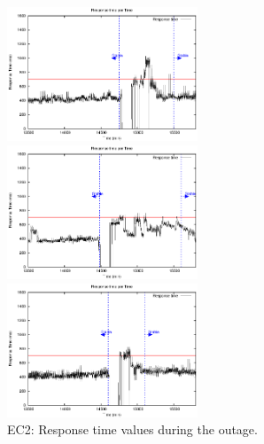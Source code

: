 \begin{figure}[htb]
	\begin{minipage}[b]{0.32\linewidth}
		\includegraphics[height=4cm]{images/exps2011/low/ec2/proxyDataPoints_output_filtered.eps}	
	\end{minipage}
	\hfill
	\begin{minipage}[b]{0.32\linewidth}
		\includegraphics[height=4cm]{images/exps2011/medium/ec2/proxyDataPoints_output_filtered.eps}
	\end{minipage}
\hfill
\begin{minipage}[b]{0.32\linewidth}
		\includegraphics[height=4cm]{images/exps2011/high/ec2/proxyDataPoints_output_filtered.eps}
	\end{minipage}
\caption{EC2: Response time values during the outage.}
\label{fig:EC2ResponseTime}
\end{figure}


